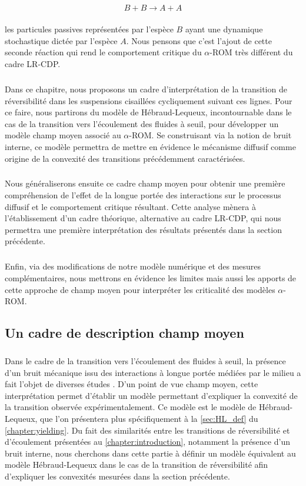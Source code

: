 \begin{equation}
	B +B \xrightarrow[]{} A + A
	\label{eq:meca_diff}
\end{equation}

\noindent les particules passives représentées par l'espèce $B$ ayant une dynamique stochastique dictée par l'espèce $A$. Nous pensons que c'est l'ajout de cette seconde réaction qui rend le comportement critique du $\alpha$-ROM très différent du cadre LR-CDP.

\subparagraph{}Dans ce chapitre, nous proposons un cadre d'interprétation de la transition de réversibilité dans les suspensions cisaillées cycliquement suivant ces lignes. Pour ce faire, nous partirons du modèle de Hébraud-Lequeux, incontournable dans le cas de la transition vers l'écoulement des fluides à seuil, pour développer un modèle champ moyen associé au $\alpha$-ROM. Se construisant via la notion de bruit interne, ce modèle permettra de mettre en évidence le mécanisme diffusif comme origine de la convexité des transitions précédemment caractérisées.

\subparagraph{}Nous généraliserons ensuite ce cadre champ moyen pour obtenir une première compréhension de  l'effet de la longue portée des interactions sur le processus diffusif et le comportement critique résultant. Cette analyse mènera à l'établissement d'un cadre théorique, alternative au cadre LR-CDP, qui nous permettra une première interprétation des résultats présentés dans la section précédente. 

\subparagraph{}Enfin, via des modifications de notre modèle numérique et des mesures complémentaires, nous mettrons en évidence les limites mais aussi les apports de cette approche de champ moyen pour interpréter les criticalité des modèles $\alpha$-ROM.

\subsection{Un cadre de description champ moyen}

\subparagraph{}Dans le cadre de la transition vers l'écoulement des fluides à seuil, la présence d'un bruit mécanique issu des interactions à longue portée médiées par le milieu a fait l'objet de diverses études \cite{lin_mean-field_2016, ferrero_criticality_2019}. D'un point de vue champ moyen, cette interprétation permet d'établir un modèle permettant d'expliquer la convexité de la transition observée expérimentalement. Ce modèle est le modèle de Hébraud-Lequeux\cite{hebraud_mode-coupling_1998}, que l'on présentera plus spécifiquement à la \autoref{sec:HL_def} du \autoref{chapter:yielding}. Du fait des similarités entre les transitions de réversibilité et d'écoulement présentées au \autoref{chapter:introduction}, notamment la présence d'un bruit interne, nous cherchons dans cette partie à définir un modèle équivalent au modèle Hébraud-Lequeux dans le cas de la transition de réversibilité afin d'expliquer les convexités mesurées dans la section précédente.

